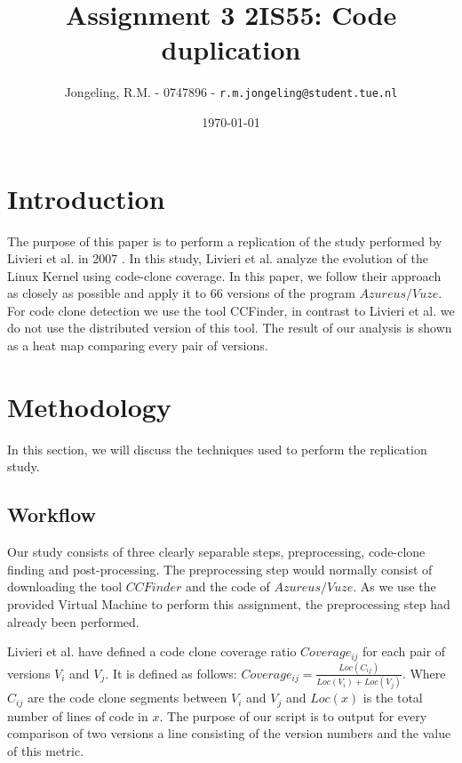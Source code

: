 \documentclass[a4paper,twoside, twocolumn, 11pt]{article}
\title{\vspace{-\baselineskip}\sffamily\bfseries Assignment 3 2IS55: Code duplication}
\author{Jongeling, R.M. - 0747896 - {\tt r.m.jongeling@student.tue.nl}}
\date{\today}
\numberwithin{equation}{section}
\begin{document}
\maketitle

\begin{abstract}

\end{abstract}

\section{Introduction}
The purpose of this paper is to perform a replication of the study performed by Livieri et al. in 2007 \cite{paper}.
In this study, Livieri et al. analyze the evolution of the Linux Kernel using code-clone coverage.
In this paper, we follow their approach as closely as possible and apply it to 66 versions of the program $Azureus/Vuze$.
For code clone detection we use the tool CCFinder, in contrast to Livieri et al. we do not use the distributed version of this tool.
The result of our analysis is shown as a heat map comparing every pair of versions.


\section{Methodology}
In this section, we will discuss the techniques used to perform the replication study.

\subsection{Workflow}
Our study consists of three clearly separable steps, preprocessing, code-clone finding and post-processing.
The preprocessing step would normally consist of downloading the tool $CCFinder$ and the code of $Azureus/Vuze$.
As we use the provided Virtual Machine to perform this assignment, the preprocessing step had already been performed.

Livieri et al. have defined a code clone coverage ratio $Coverage_{ij}$ for each pair of versions $V_i$ and $V_j$. 
It is defined as follows: $Coverage_{ij} = \frac{Loc(C_{ij})}{Loc(V_i) + Loc(V_j)}$.
Where $C_{ij}$ are the code clone segments between $V_i$ and $V_j$ and $Loc(x)$ is the total number of lines of code in $x$.
The purpose of our script is to output for every comparison of two versions a line consisting of the version numbers and the value of this metric.
\end{document}
